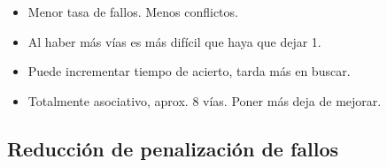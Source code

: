 \documentclass[12pt, twoside, openright]{report} %
\begin{document}
\begin{itemize}
    \begin{itemize}
    
    \item
      Menor tasa de fallos. Menos conflictos.
    \item
      Al haber más vías es más difícil que haya que dejar 1.
    \item
      Puede incrementar tiempo de acierto, tarda más en buscar.
    \item
      Totalmente asociativo, aprox. 8 vías. Poner más deja de mejorar.
    \end{itemize}
  \end{itemize}

\subsection{Reducción de penalización de fallos}
\end{document}
